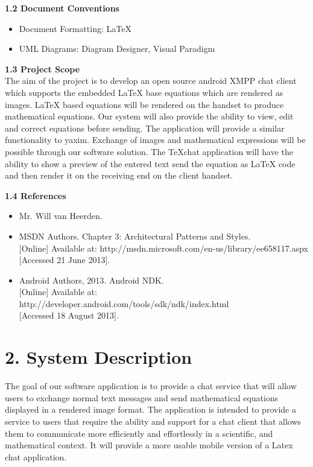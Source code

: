 \documentclass[29pt,a4paper]{moderncv}
\begin{document}
		\noindent \textbf{1.2 Document Conventions}
			\begin{itemize}
				\item Document Formatting: LaTeX
				\item UML Diagrams: Diagram Designer, Visual Paradigm
			\end{itemize}
		\vspace{5mm}
		
		\noindent \textbf{1.3 Project Scope}
			\\The aim of the project is to develop an open source android XMPP chat client which supports the embedded LaTeX base equations which are rendered as images. LaTeX based equations will be rendered on the handset to produce mathematical equations. Our system will also provide the ability to view, edit and correct equations before sending.
			\parindent 5mm The application will provide a similar functionality to yaxim. Exchange of images and mathematical expressions will be possible through our software solution. The TeXchat application will have the ability to show a preview of the entered text send the equation as LaTeX code and then render it on the receiving end on the client handset.
			
		\vspace{5mm}
		
	\noindent \textbf{1.4 References}
		\begin{itemize}
		\item Mr. Will van Heerden.
			\item MSDN Authors. Chapter 3: Architectural Patterns and Styles. 
			\\{[Online]} Available at: http://msdn.microsoft.com/en-us/library/ee658117.aspx
			\\{[Accessed 21 June 2013].}
			
			\item Android Authors, 2013. Android NDK.\\ {[Online]} Available at: http://developer.android.com/tools/sdk/ndk/index.html
				\\{[Accessed 18 August 2013].}
		\end{itemize}
		\vspace{5mm}
		
\newpage
	\section*{\textbf{2. System Description}}
		\vspace{4mm}
			\noindent The goal of our software application is to provide a chat service that will allow users to exchange normal text messages and send mathematical equations displayed in a rendered image format.  The application is intended to provide a service to users that require the ability and support for a chat client that allows them to communicate more efficiently and effortlessly in a scientific, and mathematical context. It will provide a more usable mobile version of a Latex chat application.\\ 
			
\end{document}
